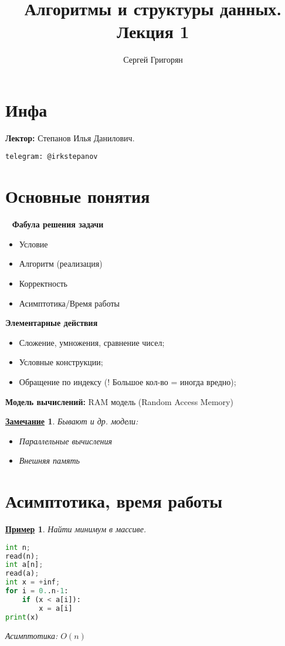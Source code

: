 \documentclass[12pt]{article}
\title{Алгоритмы и структуры данных. \\ Лекция 1}
\author{Сергей Григорян}
\newtheorem*{note}{\underline{Замечание}}
\newtheorem*{example}{\underline{Пример}}
\theoremstyle{definition}
\theoremstyle{definition}
\begin{document}
\maketitle
\newpage
\section{Инфа}
\textbf{Лектор:} Степанов Илья Данилович.

\begin{verbatim}
telegram: @irkstepanov
\end{verbatim}

\section{Основные понятия}
~\newline
\textbf{Фабула решения задачи}
\begin{itemize}
    \item Условие
    \item Алгоритм (реализация)
    \item Корректность
    \item Асимптотика/Время работы
\end{itemize}

\textbf{Элементарные действия}
\begin{itemize}
    \item Сложение, умножения, сравнение чисел;
    \item Условные конструкции;
    \item Обращение по индексу (! Большое кол-во = иногда вредно);
\end{itemize}

\textbf{Модель вычислений:} RAM модель (Random Access Memory)

\begin{note}
Бывают и др. модели:
\begin{itemize}
    \item Параллельные вычисления
    \item Внешняя память
\end{itemize}

\end{note}

\section{Асимптотика, время работы}

\begin{example}
Найти минимум в массиве.
\lstset{style=mystyle}
\begin{lstlisting}[language=Python, caption=Нахождение минимума]
int n;
read(n);
int a[n];
read(a);
int x = +inf;
for i = 0..n-1:
    if (x < a[i]):
        x = a[i]
print(x)
\end{lstlisting}
Асимптотика: $O(n)$
\end{example}
\end{document}
